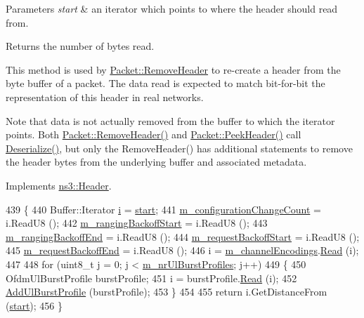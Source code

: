 \begin{DoxyParams}{Parameters}
{\em start} & an iterator which points to where the header should read from. \\
\hline
\end{DoxyParams}
\begin{DoxyReturn}{Returns}
the number of bytes read.
\end{DoxyReturn}
This method is used by \hyperlink{classns3_1_1Packet_a0961eccf975d75f902d40956c93ba63e}{Packet\+::\+Remove\+Header} to re-\/create a header from the byte buffer of a packet. The data read is expected to match bit-\/for-\/bit the representation of this header in real networks.

Note that data is not actually removed from the buffer to which the iterator points. Both \hyperlink{classns3_1_1Packet_a0961eccf975d75f902d40956c93ba63e}{Packet\+::\+Remove\+Header()} and \hyperlink{classns3_1_1Packet_aadc63487bea70945c418f4c3e9b81964}{Packet\+::\+Peek\+Header()} call \hyperlink{classns3_1_1Ucd_ada667d90122da786f3fce88f226c35e3}{Deserialize()}, but only the Remove\+Header() has additional statements to remove the header bytes from the underlying buffer and associated metadata. 

Implements \hyperlink{classns3_1_1Header_a78be9400bb66b2a8543606f395ef5396}{ns3\+::\+Header}.


\begin{DoxyCode}
439 \{
440   Buffer::Iterator \hyperlink{bernuolliDistribution_8m_a6f6ccfcf58b31cb6412107d9d5281426}{i} = \hyperlink{namespacevisualizer_1_1core_a2a35e5d8a34af358b508dac8635754e0}{start};
441   \hyperlink{classns3_1_1Ucd_ad8588333860e7ee98bf544151dde0547}{m\_configurationChangeCount} = i.ReadU8 ();
442   \hyperlink{classns3_1_1Ucd_a2bb56a9a68e0d2db278e6ad4ec9c79d2}{m\_rangingBackoffStart} = i.ReadU8 ();
443   \hyperlink{classns3_1_1Ucd_a3d2a0adbdf513ce664f981286c38fdc5}{m\_rangingBackoffEnd} = i.ReadU8 ();
444   \hyperlink{classns3_1_1Ucd_a349ad1738aaa8cb6f50dbba40be0a452}{m\_requestBackoffStart} = i.ReadU8 ();
445   \hyperlink{classns3_1_1Ucd_a347ffdff28ebe47d4db585c35780e54d}{m\_requestBackoffEnd} = i.ReadU8 ();
446   i = \hyperlink{classns3_1_1Ucd_afe2c90d9bf2fd6c010743784cdb55dd8}{m\_channelEncodings}.\hyperlink{classns3_1_1UcdChannelEncodings_ab4bf0ada0156e96466807d97b22b233a}{Read} (i);
447 
448   \textcolor{keywordflow}{for} (uint8\_t j = 0; j < \hyperlink{classns3_1_1Ucd_a1f48b85ec8e263a0ec5b59e9f5f6b5d4}{m\_nrUlBurstProfiles}; j++)
449     \{
450       OfdmUlBurstProfile burstProfile;
451       i = burstProfile.\hyperlink{classns3_1_1Buffer_1_1Iterator_a84e2f58f26fa3a3fec00c11e911b530a}{Read} (i);
452       \hyperlink{classns3_1_1Ucd_a4b007bc9afca2c4b31949a49c24303e9}{AddUlBurstProfile} (burstProfile);
453     \}
454 
455   \textcolor{keywordflow}{return} i.GetDistanceFrom (\hyperlink{namespacevisualizer_1_1core_a2a35e5d8a34af358b508dac8635754e0}{start});
456 \}
\end{DoxyCode}


